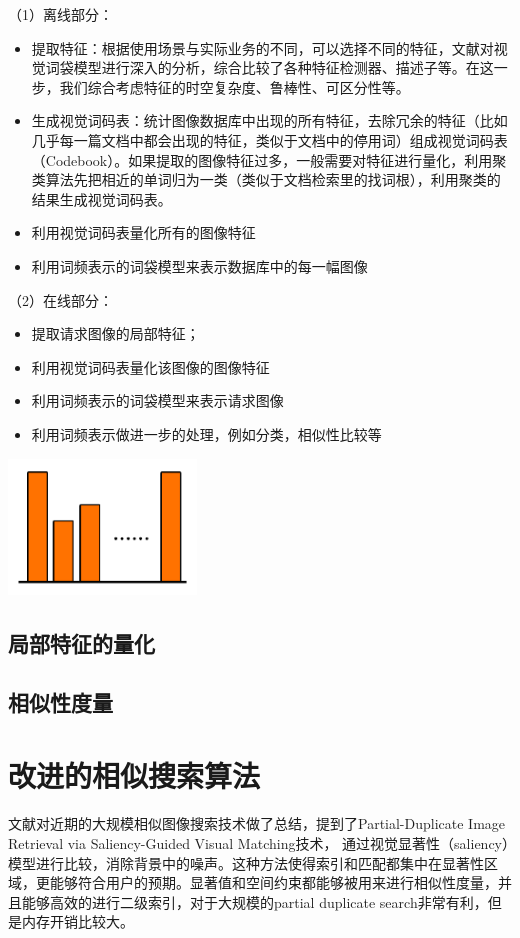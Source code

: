 （1）离线部分：
\begin{itemize}
\item 提取特征：根据使用场景与实际业务的不同，可以选择不同的特征，文献\cite{Zhang:2006ej}对视觉词袋模型进行深入的分析，综合比较了各种特征检测器、描述子等。在这一步，我们综合考虑特征的时空复杂度、鲁棒性、可区分性等。
\item 生成视觉词码表：统计图像数据库中出现的所有特征，去除冗余的特征（比如几乎每一篇文档中都会出现的特征，类似于文档中的停用词）组成视觉词码表（Codebook）。如果提取的图像特征过多，一般需要对特征进行量化，利用聚类算法先把相近的单词归为一类（类似于文档检索里的找词根），利用聚类的结果生成视觉词码表。
\item 利用视觉词码表量化所有的图像特征
\item 利用词频表示的词袋模型来表示数据库中的每一幅图像
\end{itemize}

（2）在线部分：
\begin{itemize}
\item 提取请求图像的局部特征；
\item 利用视觉词码表量化该图像的图像特征
\item 利用词频表示的词袋模型来表示请求图像
\item 利用词频表示做进一步的处理，例如分类，相似性比较等
\end{itemize}

\includegraphics[width=5.00cm]{imgs/ch3/histogram}

\subsection{局部特征的量化}

\subsection{相似性度量}


\section{改进的相似搜索算法}
文献\cite{POLICY:2013te}对近期的大规模相似图像搜索技术做了总结，提到了Partial-Duplicate Image Retrieval via Saliency-Guided Visual Matching\cite{Li:2013ks}技术，
通过视觉显著性（saliency）模型进行比较，消除背景中的噪声。这种方法使得索引和匹配都集中在显著性区域，更能够符合用户的预期。显著值和空间约束都能够被用来进行相似性度量，并且能够高效的进行二级索引，对于大规模的partial duplicate search非常有利，但是内存开销比较大。

